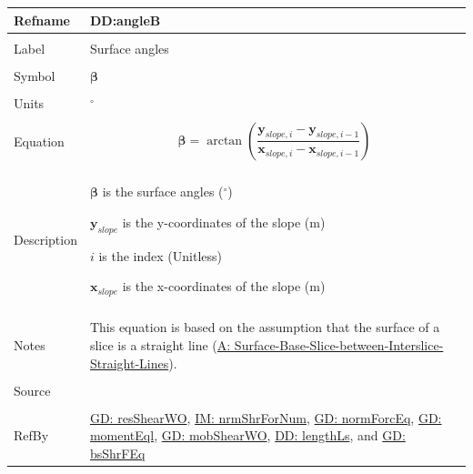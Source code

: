 \documentclass[12pt]{article}
\begin{document}
\noindent \begin{minipage}{\textwidth}
          \begin{tabular}{>{\raggedright}p{}>{\raggedright\arraybackslash}p{}}
          \toprule \textbf{Refname} & \textbf{DD:angleB}
          \label{DD:angleB}
          \\ \midrule \\
          Label & Surface angles
          \\ \midrule \\
          Symbol & $\mathbf{β}$
          \\ \midrule \\
          Units & ${}^{\circ}$
          \\ \midrule \\
          Equation & \begin{displaymath}
                     \mathbf{β}=\arctan\left(\frac{{\mathbf{y}_{slope,i}}-{\mathbf{y}_{slope,i-1}}}{{\mathbf{x}_{slope,i}}-{\mathbf{x}_{slope,i-1}}}\right)
                     \end{displaymath}
          \\ \midrule \\
          Description & \begin{symbDescription}
                        \item{$\mathbf{β}$ is the surface angles (${}^{\circ}$)}
                        \item{${\mathbf{y}_{slope}}$ is the y-coordinates of the slope (m)}
                        \item{$i$ is the index (Unitless)}
                        \item{${\mathbf{x}_{slope}}$ is the x-coordinates of the slope (m)}
                        \end{symbDescription}
          \\ \midrule \\
          Notes & This equation is based on the assumption that the surface of a slice is a straight line (\hyperref[assumpSBSBISL]{A: Surface-Base-Slice-between-Interslice-Straight-Lines}).
          \\ \midrule \\
          Source & \cite{fredlund1977}
          \\ \midrule \\
          RefBy & \hyperref[GD:resShearWO]{GD: resShearWO}, \hyperref[IM:nrmShrForNum]{IM: nrmShrForNum}, \hyperref[GD:normForcEq]{GD: normForcEq}, \hyperref[GD:momentEql]{GD: momentEql}, \hyperref[GD:mobShearWO]{GD: mobShearWO}, \hyperref[DD:lengthLs]{DD: lengthLs}, and \hyperref[GD:bsShrFEq]{GD: bsShrFEq}
          \\ \bottomrule
          \end{tabular}
          \end{minipage}
\par~
\end{document}
